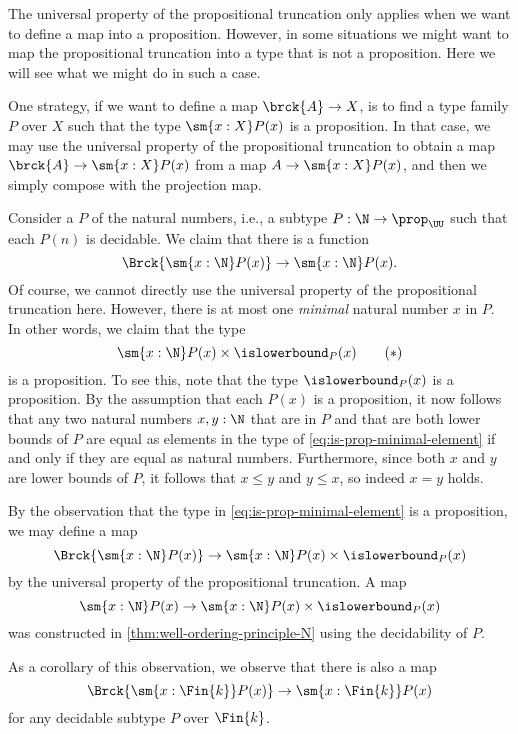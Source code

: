 The universal property of the propositional truncation only applies when we want to define a map into a proposition. However, in some situations we might want to map the propositional truncation into a type that is not a proposition. Here we will see what we might do in such a case.

One strategy, if we want to define a map $\brck{A}\to X$, is to find a type family $P$ over $X$ such that the type $\sm{x:X}P(x)$ is a proposition. In that case, we may use the universal property of the propositional truncation to obtain a map $\brck{A}\to \sm{x:X}P(x)$ from a map $A\to \sm{x:X}P(x)$, and then we simply compose with the projection map.

\begin{eg}\label{eg:global-choice-decidable-subtype-N}
  Consider a  $P$ of the natural numbers, i.e., a subtype $P:\N\to\prop_\UU$ such that each $P(n)$ is decidable. We claim that there is a function
  \begin{equation*}
    \Brck{\sm{x:\N}P(x)}\to\sm{x:\N}P(x).
  \end{equation*}
  Of course, we cannot directly use the universal property of the propositional truncation here. However, there is at most one \emph{minimal} natural number $x$ in $P$. In other words, we claim that the type
  \begin{equation}\label{eq:is-prop-minimal-element}
    \sm{x:\N}P(x)\times\islowerbound_P(x)\tag{\textasteriskcentered}
  \end{equation}
  is a proposition. To see this, note that the type $\islowerbound_P(x)$ is a proposition. By the assumption that each $P(x)$ is a proposition, it now follows that any two natural numbers $x,y:\N$ that are in $P$ and that are both lower bounds of $P$ are equal as elements in the type of \cref{eq:is-prop-minimal-element} if and only if they are equal as natural numbers. Furthermore, since both $x$ and $y$ are lower bounds of $P$, it follows that $x\leq y$ and $y\leq x$, so indeed $x=y$ holds.

  By the observation that the type in \cref{eq:is-prop-minimal-element} is a proposition, we may define a map
  \begin{equation*}
    \Brck{\sm{x:\N}P(x)}\to \sm{x:\N}P(x)\times\islowerbound_P(x)
  \end{equation*}
  by the universal property of the propositional truncation. A map
  \begin{equation*}
    \sm{x:\N}P(x)\to\sm{x:\N}P(x)\times\islowerbound_P(x)
  \end{equation*}
  was constructed in \cref{thm:well-ordering-principle-N} using the decidability of $P$.

  As a corollary of this observation, we observe that there is also a map
  \begin{equation*}
    \Brck{\sm{x:\Fin{k}}P(x)}\to\sm{x:\Fin{k}}P(x)
  \end{equation*}
  for any decidable subtype $P$ over $\Fin{k}$.
\end{eg}


